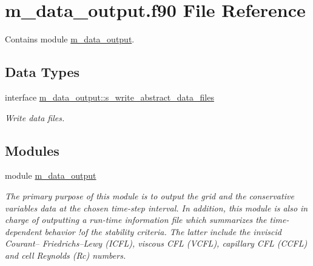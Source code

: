 \hypertarget{m__data__output_8f90}{}\section{m\+\_\+data\+\_\+output.\+f90 File Reference}
\label{m__data__output_8f90}


Contains module \hyperlink{namespacem__data__output}{m\+\_\+data\+\_\+output}.  


\subsection*{Data Types}
\begin{DoxyCompactItemize}
\item 
interface \hyperlink{interfacem__data__output_1_1s__write__abstract__data__files}{m\+\_\+data\+\_\+output\+::s\+\_\+write\+\_\+abstract\+\_\+data\+\_\+files}
\begin{DoxyCompactList}\small\item\em Write data files. \end{DoxyCompactList}\end{DoxyCompactItemize}
\subsection*{Modules}
\begin{DoxyCompactItemize}
\item 
module \hyperlink{namespacem__data__output}{m\+\_\+data\+\_\+output}
\begin{DoxyCompactList}\small\item\em The primary purpose of this module is to output the grid and the conservative variables data at the chosen time-\/step interval. In addition, this module is also in charge of outputting a run-\/time information file which summarizes the time-\/dependent behavior !of the stability criteria. The latter include the inviscid Courant– Friedrichs–\+Lewy (I\+C\+FL), viscous C\+FL (V\+C\+FL), capillary C\+FL (C\+C\+FL) and cell Reynolds (Rc) numbers. \end{DoxyCompactList}\end{DoxyCompactItemize}
